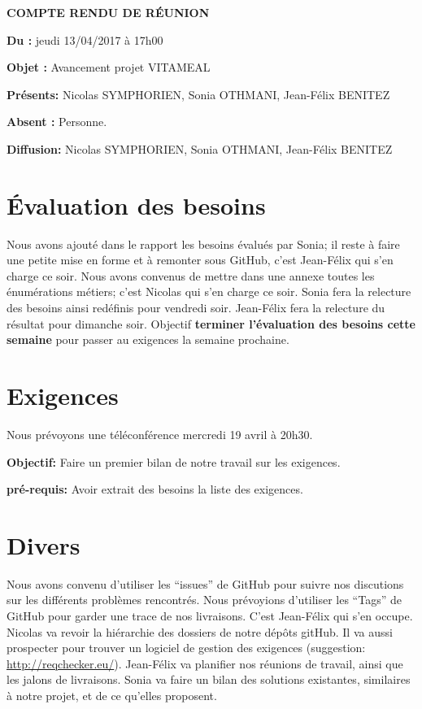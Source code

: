 \documentclass[11pt,a4paper,french,twoside,openright]{article}
\begin{document}
\pagestyle{fancy}

\begin{center}\bfseries\Huge
COMPTE RENDU DE RÉUNION
\end{center}

\textbf{Du      :} jeudi 13/04/2017 à 17h00

\textbf{Objet   :} Avancement projet VITAMEAL

\textbf{Présents:} Nicolas SYMPHORIEN, Sonia OTHMANI, Jean-Félix BENITEZ

\textbf{Absent :} Personne.

\textbf{Diffusion:} Nicolas SYMPHORIEN, Sonia OTHMANI, Jean-Félix BENITEZ

\hrulefill

\section{Évaluation des besoins}
Nous avons ajouté dans le rapport les besoins évalués par Sonia; il reste à faire une petite mise en forme et à remonter sous GitHub, c'est Jean-Félix qui s'en charge ce soir.
Nous avons convenus de mettre dans une annexe toutes les énumérations métiers; c'est Nicolas qui s'en charge ce soir.
Sonia fera la relecture des besoins ainsi redéfinis pour vendredi soir. Jean-Félix fera la relecture du résultat pour dimanche soir.
Objectif \textbf{terminer l'évaluation des besoins cette semaine} pour passer au exigences la semaine prochaine.

\section{Exigences}
Nous prévoyons une téléconférence mercredi 19 avril à 20h30.

\textbf{Objectif:} Faire un premier bilan de notre travail sur les exigences.

\textbf{pré-requis:} Avoir extrait des besoins la liste des exigences.

\section{Divers}
Nous avons convenu d'utiliser les \enquote{issues} de GitHub pour suivre nos discutions sur les différents problèmes rencontrés.
Nous prévoyions d'utiliser les \enquote{Tags} de GitHub pour garder une trace de nos livraisons. C'est Jean-Félix qui s'en occupe.
Nicolas va revoir la hiérarchie des dossiers de notre dépôts gitHub. Il va aussi prospecter pour trouver un logiciel de gestion des exigences (suggestion: \url{http://reqchecker.eu/}).
Jean-Félix va planifier nos réunions de travail, ainsi que les jalons de livraisons.
Sonia va faire un bilan des solutions existantes, similaires à notre projet, et de ce qu'elles proposent.

\label{LastPage}
\end{document}
